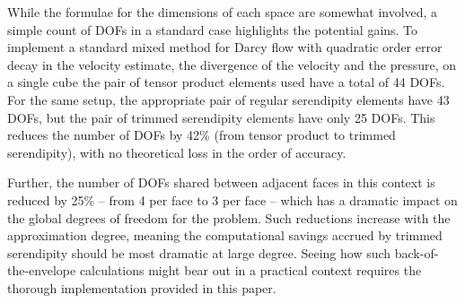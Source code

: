 \documentclass[format=acmsmall,screen,timestamp=false,a4paper]{acmart}
\newcommand\akg[1]{\textbf{\textcolor[rgb]{.5,0,1}{[Andrew: #1]}}}
\newcommand\lm[1]{\textbf{\textcolor[rgb]{1,0,0.5}{[Lawrence: #1]}}}
\newcommand{\calS}{\mathcal{S}}
\begin{document}
   While the formulae for the dimensions of each space are somewhat involved, a simple count of DOFs in a standard case highlights the potential gains.
   To implement a standard mixed method for Darcy flow with quadratic order error decay in the velocity estimate, the divergence of the velocity and the pressure, on a single cube the pair of tensor product elements used have a total of 44 DOFs.
   For the same setup, the appropriate pair of regular serendipity elements have 43 DOFs, but the pair of trimmed serendipity elements have only 25 DOFs. 
   This reduces the number of DOFs by 42\% (from tensor product to trimmed serendipity), with no theoretical loss in the order of accuracy.
   
   Further, the number of DOFs shared between adjacent faces in this context is reduced by 25\% -- from 4 per face to 3 per face -- which has a dramatic impact on the global degrees of freedom for the problem.
   Such reductions increase with the approximation degree, meaning the computational savings accrued by trimmed serendipity should be most dramatic at large degree.  
   Seeing how such back-of-the-envelope calculations might bear out in a practical context requires the thorough implementation provided in this paper. %
   
   
   
   
\end{document}
